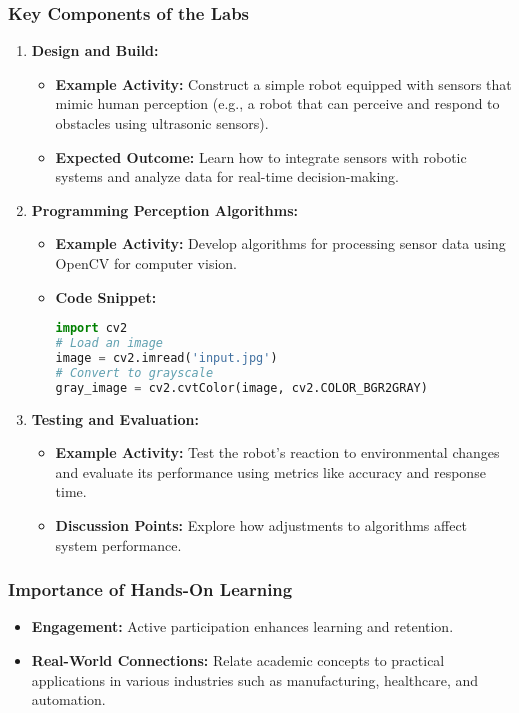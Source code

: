 \documentclass{beamer}
\begin{document}
\begin{frame}[fragile]
    \frametitle{Key Components of the Labs}
    \begin{enumerate}
        \item \textbf{Design and Build:}
            \begin{itemize}
                \item \textbf{Example Activity:} Construct a simple robot equipped with sensors that mimic human perception (e.g., a robot that can perceive and respond to obstacles using ultrasonic sensors).
                \item \textbf{Expected Outcome:} Learn how to integrate sensors with robotic systems and analyze data for real-time decision-making.
            \end{itemize}
        \item \textbf{Programming Perception Algorithms:}
            \begin{itemize}
                \item \textbf{Example Activity:} Develop algorithms for processing sensor data using OpenCV for computer vision.
                \item \textbf{Code Snippet:} 
                \begin{lstlisting}[language=Python]
import cv2
# Load an image
image = cv2.imread('input.jpg')
# Convert to grayscale
gray_image = cv2.cvtColor(image, cv2.COLOR_BGR2GRAY)
                \end{lstlisting}
            \end{itemize}
        \item \textbf{Testing and Evaluation:}
            \begin{itemize}
                \item \textbf{Example Activity:} Test the robot's reaction to environmental changes and evaluate its performance using metrics like accuracy and response time.
                \item \textbf{Discussion Points:} Explore how adjustments to algorithms affect system performance.
            \end{itemize}
    \end{enumerate}
\end{frame}

\begin{frame}[fragile]
    \frametitle{Importance of Hands-On Learning}
    \begin{itemize}
        \item \textbf{Engagement:} Active participation enhances learning and retention.
        \item \textbf{Real-World Connections:} Relate academic concepts to practical applications in various industries such as manufacturing, healthcare, and automation.
    \end{itemize}
\end{frame}
\end{document}
